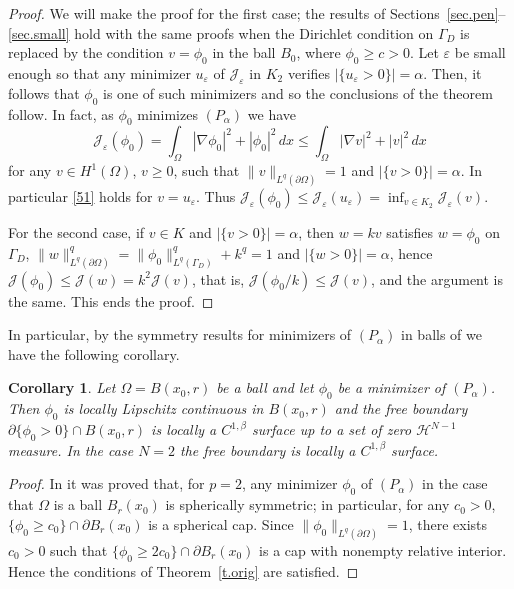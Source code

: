 \documentclass[11pt]{amsart}
\newtheorem{corollary}{Corollary}[section]
\theoremstyle{definition}
\theoremstyle{remark}
\numberwithin{equation}{section}
\newcommand{\cH}{\mathcal{H}}
\newcommand{\cJ}{\mathcal{J}}
\begin{document}
\begin{proof}
We will make the proof for the first case; the results of Sections~\ref{sec.pen}--\ref{sec.small} hold with the same proofs when the Dirichlet condition on $\Gamma_D$ is replaced by the condition $v=\phi_0$ in the ball $B_0$, where $\phi_0\ge c>0$. Let $\varepsilon$ be small enough so that any minimizer $u_\varepsilon$ of $\cJ_\varepsilon$ in $K_2$ verifies $|\{u_\varepsilon>0\}|=\alpha$. Then, it follows that $\phi_0$ is one of such minimizers and so the conclusions of the theorem follow. In fact, as $\phi_0$ minimizes $(P_\alpha)$ we have
\begin{equation}\label{51}
\cJ_\varepsilon(\phi_0)=\int_\Omega|\nabla\phi_0|^2+|\phi_0|^2\,dx\le\int_\Omega|\nabla v|^2+|v|^2\,dx
\end{equation}
for any $v\in H^1(\Omega)$, $v\ge0$, such that $\|v\|_{L^q(\partial\Omega)}=1$ and $|\{v>0\}|=\alpha$. In particular \eqref{51} holds for $v=u_\varepsilon$. Thus $\cJ_\varepsilon(\phi_0)\le\cJ_\varepsilon(u_\varepsilon)=\inf_{v\in K_2}\cJ_\varepsilon(v)$.

For the second case, if $v\in K$ and $|\{v>0\}|=\alpha$, then $w=kv$ satisfies $w=\phi_0$ on $\Gamma_D$, $\|w\|^q_{L^q(\partial\Omega)}=\|\phi_0\|^q_{L^q(\Gamma_D)}+k^q=1$ and $|\{w>0\}|=\alpha$, hence $\cJ(\phi_0)\le\cJ(w)=k^2\cJ(v)$, that is, $\cJ(\phi_0/k)\le\cJ(v)$, and the argument is the same. This ends the proof.
\end{proof}

In particular, by the symmetry results for minimizers of $(P_\alpha)$ in balls of \cite{FBRW1} we have the following corollary.

\begin{corollary}\label{c.ball}
Let $\Omega=B(x_0,r)$ be a ball and let $\phi_0$ be a minimizer of $(P_\alpha)$. Then $\phi_0$ is locally Lipschitz continuous in $B(x_0,r)$ and the free boundary $\partial\{\phi_0>0\}\cap B(x_0,r)$ is locally a $C^{1,\beta}$ surface up to a set of zero $\cH^{N-1}$ measure. In the case $N=2$ the free boundary is locally a $C^{1,\beta}$ surface.
\end{corollary}

\begin{proof}
In \cite[Theorem~1.4]{FBRW1} it was proved that, for $p=2$, any minimizer $\phi_0$ of $(P_\alpha)$ in the case that $\Omega$ is a ball $B_r(x_0)$ is spherically symmetric; in particular, for any $c_0>0$, $\{\phi_0\ge c_0\}\cap\partial B_r(x_0)$ is a spherical cap. Since $\|\phi_0\|_{L^q(\partial\Omega)}=1$, there exists $c_0>0$ such that $\{\phi_0\ge 2c_0\}\cap\partial B_r(x_0)$ is a cap with nonempty relative interior. Hence the conditions of Theorem~\ref{t.orig} are satisfied.
\end{proof}
\end{document}
